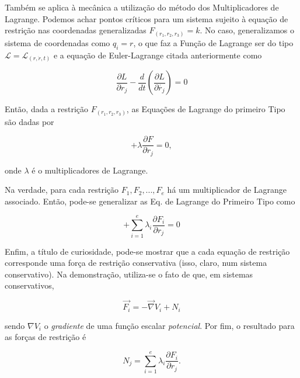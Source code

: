 \documentclass{article}
\begin{document}
Também se aplica à mecânica a utilização do método dos Multiplicadores de Lagrange. Podemos achar pontos críticos para um sistema sujeito à equação de restrição nas coordenadas generalizadas $F_{(r_1,r_2,r_3)}=k$. No caso, generalizamos o sistema de coordenadas como $q_i=r$, o que faz a Função de Lagrange ser do tipo $\mathcal{L}=\mathcal{L}_{(r,\dot{r},t)}$ e a equação de Euler-Lagrange citada anteriormente como

\begin{equation}
     \frac{\partial L}{\partial r_j} - \frac{d}{dt}(\frac{\partial L}{\partial \dot{r_j}
    })=0
\end{equation}


Então, dada a restrição $F_{(r_1,r_2,r_3)}$, as Equações de Lagrange do primeiro Tipo são dadas por

\begin{equation}
   [\frac{\partial L}{\partial r} - \frac{d}{dt}(\frac{\partial L}{\partial \dot{r}
    })] + \lambda \frac{\partial F}{\partial r_j} = 0 ,
\end{equation}

onde $\lambda$ é o multiplicadores de Lagrange.

Na verdade, para cada restrição $F_1, F_2, ..., F_e$ há um multiplicador de Lagrange associado. Então, pode-se generalizar as Eq. de Lagrange do Primeiro Tipo como

\begin{equation}
    [\frac{\partial L}{\partial r} - \frac{d}{dt}(\frac{\partial L}{\partial \dot{r}
    })] + \sum_{i=1}^e \lambda_i \frac{\partial F_i}{\partial r_j} = 0
\end{equation}

Enfim, a título de curiosidade, pode-se mostrar que a cada equação de restrição corresponde uma força de restrição conservativa (isso, claro, num sistema conservativo). Na demonstração, utiliza-se o fato de que, em sistemas conservativos,

\begin{equation}
    \vec{F_i} = -\vec{\nabla} V_i + N_i
\end{equation}

sendo $\nabla V_i$ o \textit{gradiente} de uma função escalar \textit{potencial}. Por fim, o resultado para as forças de restrição é 

\begin{equation}
    N_j = \sum_{i=1}^e \lambda_i \frac{\partial F_i}{\partial r_j} .
\end{equation}
\end{document}
